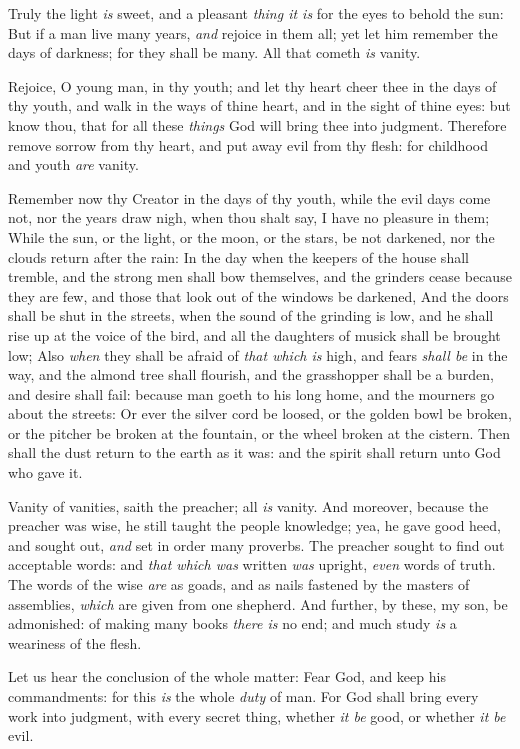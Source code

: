\documentclass[11pt,letterpaper,oneside]{memoir}
\begin{document}
Truly the light \emph{is} sweet, and a pleasant \emph{thing it is} for 
the eyes to behold the sun: But if a man live many years, \emph{and} 
rejoice in them all; yet let him remember the days of darkness; for they 
shall be many. All that cometh \emph{is} vanity. 

Rejoice, O young man, in thy youth; and let thy heart cheer thee in the 
days of thy youth, and walk in the ways of thine heart, and in the sight 
of thine eyes: but know thou, that for all these \emph{things} God will 
bring thee into judgment. Therefore remove sorrow from thy heart, and 
put away evil from thy flesh: for childhood and youth \emph{are} vanity. 

Remember now thy Creator in the days of thy youth, while the evil days 
come not, nor the years draw nigh, when thou shalt say, I have no 
pleasure in them; While the sun, or the light, or the moon, or the 
stars, be not darkened, nor the clouds return after the rain: In the day 
when the keepers of the house shall tremble, and the strong men shall 
bow themselves, and the grinders cease because they are few, and those 
that look out of the windows be darkened, And the doors shall be shut in 
the streets, when the sound of the grinding is low, and he shall rise up 
at the voice of the bird, and all the daughters of musick shall be 
brought low; Also \emph{when} they shall be afraid of \emph{that which 
is} high, and fears \emph{shall be} in the way, and the almond tree 
shall flourish, and the grasshopper shall be a burden, and desire shall 
fail: because man goeth to his long home, and the mourners go about the 
streets: Or ever the silver cord be loosed, or the golden bowl be 
broken, or the pitcher be broken at the fountain, or the wheel broken at 
the cistern. Then shall the dust return to the earth as it was: and the 
spirit shall return unto God who gave it. 

Vanity of vanities, saith the preacher; all \emph{is} vanity. And 
moreover, because the preacher was wise, he still taught the people 
knowledge; yea, he gave good heed, and sought out, \emph{and} set in 
order many proverbs. The preacher sought to find out acceptable words: 
and \emph{that which was} written \emph{was} upright, \emph{even} words 
of truth. The words of the wise \emph{are} as goads, and as nails 
fastened by the masters of assemblies, \emph{which} are given from one 
shepherd. And further, by these, my son, be admonished: of making many 
books \emph{there is} no end; and much study \emph{is} a weariness of 
the flesh. 

Let us hear the conclusion of the whole matter: Fear God, and keep his 
commandments: for this \emph{is} the whole \emph{duty} of man. For God 
shall bring every work into judgment, with every secret thing, whether 
\emph{it be} good, or whether \emph{it be} evil.
\end{document}

